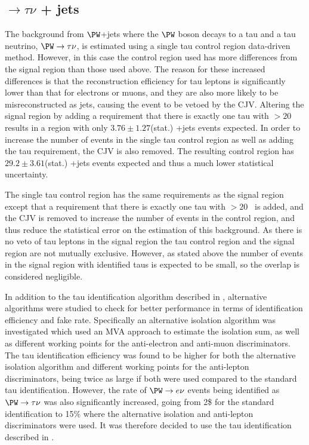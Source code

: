 \subsection{\PW$\rightarrow \tau\nu$ + jets}%
\label{sec:promptwtaunu}
The background from $\PW$+jets where the $\PW$ boson decays to a tau and a tau neutrino, $\PW\rightarrow\tau\nu$, is estimated using a single tau control region data-driven method. However, in this case the control region used has more differences from the signal region than those used above. The reason for these increased differences is that the reconstruction efficiency for tau leptons is significantly lower than that for electrons or muons, and they are also more likely to be misreconstructed as jets, causing the event to be vetoed by the \ac{CJV}. Altering the signal region by adding a requirement that there is exactly one tau with \pt$>20$ \GeV\, results in a region with only $3.76\pm 1.27$(stat.) \PW+jets events expected. In order to increase the number of events in the single tau control region as well as adding the tau requirement, the \ac{CJV} is also removed. The resulting control region has $29.2\pm 3.61$(stat.) \PW+jets events expected and thus a much lower statistical uncertainty.

The single tau control region has the same requirements as the signal region except that a requirement that there is exactly one tau with \pt$>20$ \GeV\, is added, and the \ac{CJV} is removed to increase the number of events in the control region, and thus reduce the statistical error on the estimation of this background. As there is no veto of tau leptons in the signal region the tau control region and the signal region are not mutually exclusive. However, as stated above the number of events in the signal region with identified taus is expected to be small, so the overlap is considered negligible.

In addition to the tau identification algorithm described in , alternative algorithms were studied to check for better performance in terms of identification efficiency and fake rate. Specifically an alternative isolation algorithm was investigated which used an \ac{MVA} approach to estimate the isolation sum, as well as different working points for the anti-electron and anti-muon discriminators. The tau identification efficiency was found to be higher for both the alternative isolation algorithm and different working points for the anti-lepton discriminators, being twice as large if both were used compared to the standard tau identification. However, the rate of $\PW\rightarrow e\nu$ events being identified as $\PW\rightarrow\tau\nu$ was also significantly increased, going from 2\$ for the standard identification to 15\% where the alternative isolation and anti-lepton discriminators were used. It was therefore decided to use the tau identification described in .

